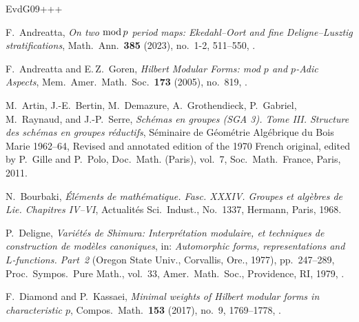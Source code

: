 \newcommand{\etalchar}[1]{$^{#1}$}
\providecommand{\bysame}{\leavevmode\hbox to3em{\hrulefill}\thinspace}

\begin{thebibliography}{EvdG09+++}

F.~Andreatta, \emph{On two {${\rm mod}\,p$} period maps: {E}kedahl--{O}ort and
  fine {D}eligne--{L}usztig stratifications}, Math.\ Ann.\ \textbf{385} (2023),
no.~1-2, 511--550, .

F.~Andreatta and E.\,Z.~Goren, \emph{Hilbert Modular Forms: mod $p$ and $p$-Adic
  Aspects}, Mem.\ Amer.\ Math.\ Soc.\ \textbf{173} (2005), no.~819, 
.

  
\bibitem[ABD{\etalchar{+}}11]{SGA3}
M.~Artin, J.-E.~Bertin, M.~Demazure, A.~Grothendieck, P.~Gabriel, M.~Raynaud, and J.-P.~Serre,  \emph{Sch\'emas en groupes (SGA 3). Tome III. Structure des sch\'emas en groupes r\'eductifs}, S\'eminaire de G\'eom\'etrie Alg\'ebrique du Bois Marie 1962--64, Revised and annotated edition of the 1970 French original, edited by P.~Gille and P.~Polo, Doc.\ Math. (Paris), vol.~7, Soc.\ Math.\ France,
Paris, 2011.

  N.~Bourbaki, \emph{\'El\'ements de math\'ematique. Fasc. XXXIV. Groupes et alg\`ebres de Lie. Chapitres IV--VI}, Actualit\'es Sci.\ Indust., No.~1337, Hermann, Paris, 1968. 


P.~Deligne, \emph{Vari\'et\'es de {S}himura: {I}nterpr\'etation modulaire, et
  techniques de construction de mod\`eles canoniques}, in: \emph{Automorphic forms,  representations and {$L$}-functions. Part~2} ({O}regon {S}tate {U}niv., {C}orvallis, Ore., 1977), pp.~247--289, {P}roc.\ {S}ympos.\ {P}ure {M}ath., vol.~33, Amer.\ Math.\ Soc., Providence, RI,
  1979, .

F.~Diamond and P.~Kassaei, \emph{Minimal weights of {H}ilbert modular forms in
  characteristic {$p$}}, Compos.\ Math.\ \textbf{153} (2017), no.~9, 1769--1778,
.


\end{thebibliography}
